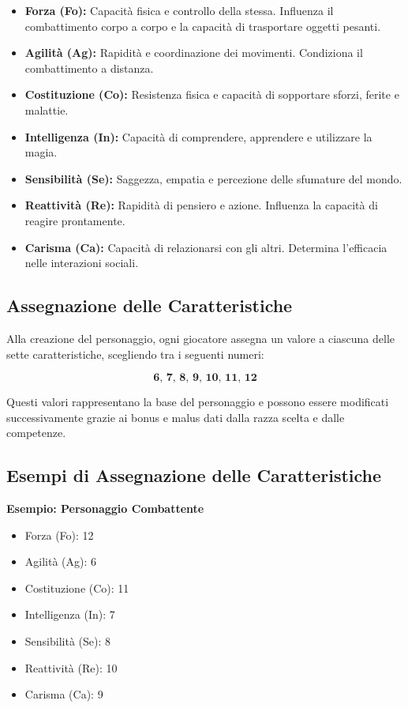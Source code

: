 \documentclass[../manuale_main.tex]{subfiles}
\begin{document}
\begin{itemize}
    \item \textbf{Forza (Fo):} Capacità fisica e controllo della stessa. Influenza il combattimento corpo a corpo e la capacità di trasportare oggetti pesanti.
    \item \textbf{Agilità (Ag):} Rapidità e coordinazione dei movimenti. Condiziona il combattimento a distanza.
    \item \textbf{Costituzione (Co):} Resistenza fisica e capacità di sopportare sforzi, ferite e malattie.
    \item \textbf{Intelligenza (In):} Capacità di comprendere, apprendere e utilizzare la magia.
    \item \textbf{Sensibilità (Se):} Saggezza, empatia e percezione delle sfumature del mondo.
    \item \textbf{Reattività (Re):} Rapidità di pensiero e azione. Influenza la capacità di reagire prontamente.
    \item \textbf{Carisma (Ca):} Capacità di relazionarsi con gli altri. Determina l’efficacia nelle interazioni sociali.
\end{itemize}

\subsection*{Assegnazione delle Caratteristiche}
Alla creazione del personaggio, ogni giocatore assegna un valore a ciascuna delle sette caratteristiche, scegliendo tra i seguenti numeri:

\[
\textbf{6, 7, 8, 9, 10, 11, 12}
\]

Questi valori rappresentano la base del personaggio e possono essere modificati successivamente grazie ai bonus e malus dati dalla razza scelta e dalle competenze.

\vspace{0.3cm}

\subsection*{Esempi di Assegnazione delle Caratteristiche}
\textbf{Esempio: Personaggio Combattente}
\begin{itemize}
    \item Forza (Fo): 12
    \item Agilità (Ag): 6
    \item Costituzione (Co): 11
    \item Intelligenza (In): 7
    \item Sensibilità (Se): 8
    \item Reattività (Re): 10
    \item Carisma (Ca): 9
\end{itemize}
\end{document}
